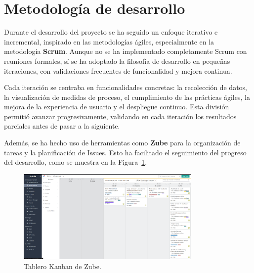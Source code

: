 

\section{Metodología de desarrollo}

Durante el desarrollo del proyecto se ha seguido un enfoque iterativo e incremental, inspirado en las metodologías ágiles, especialmente en la metodología \textbf{Scrum}. Aunque no se ha implementado completamente Scrum con reuniones formales, sí se ha adoptado la filosofía de desarrollo en pequeñas iteraciones, con validaciones frecuentes de funcionalidad y mejora continua.

Cada iteración se centraba en funcionalidades concretas: la recolección de datos, la visualización de medidas de proceso, el cumplimiento de las prácticas ágiles, la mejora de la experiencia de usuario y el despliegue continuo. Esta división permitió avanzar progresivamente, validando en cada iteración los resultados parciales antes de pasar a la siguiente.

Además, se ha hecho uso de herramientas como \textbf{Zube} para la organización de tareas y la planificación de Issues. Esto ha facilitado el seguimiento del progreso del desarrollo, como se muestra en la Figura~\ref{fig:IteracionZube}.

\begin{figure}[H]
\centering
\includegraphics[width=0.8\textwidth]{img/4.1 IteracionZube.png}
\caption{Tablero Kanban de Zube.}
\label{fig:IteracionZube}
\end{figure}

